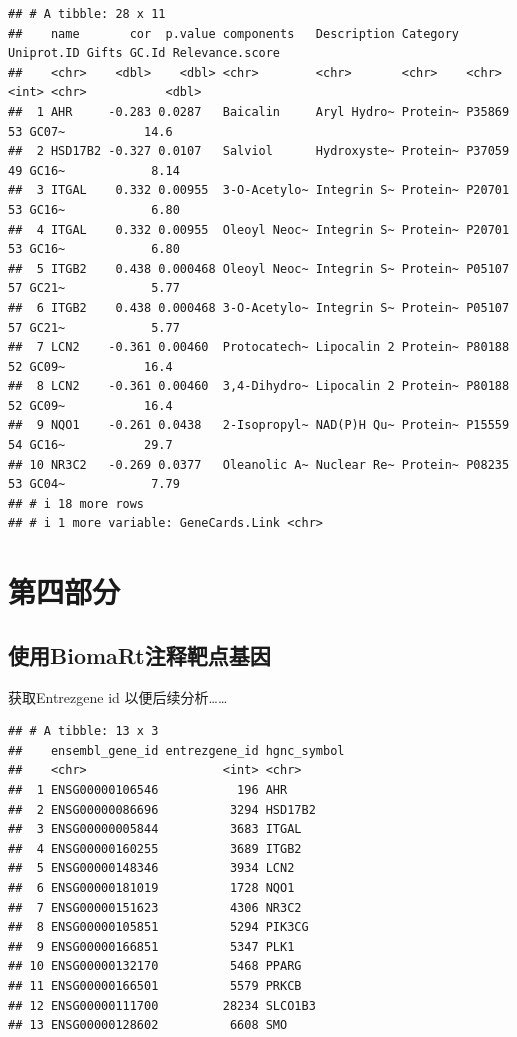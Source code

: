 \documentclass[
]{article}
\begin{document}
\begin{verbatim}
## # A tibble: 28 x 11
##    name       cor  p.value components   Description Category Uniprot.ID Gifts GC.Id Relevance.score
##    <chr>    <dbl>    <dbl> <chr>        <chr>       <chr>    <chr>      <int> <chr>           <dbl>
##  1 AHR     -0.283 0.0287   Baicalin     Aryl Hydro~ Protein~ P35869        53 GC07~           14.6 
##  2 HSD17B2 -0.327 0.0107   Salviol      Hydroxyste~ Protein~ P37059        49 GC16~            8.14
##  3 ITGAL    0.332 0.00955  3-O-Acetylo~ Integrin S~ Protein~ P20701        53 GC16~            6.80
##  4 ITGAL    0.332 0.00955  Oleoyl Neoc~ Integrin S~ Protein~ P20701        53 GC16~            6.80
##  5 ITGB2    0.438 0.000468 Oleoyl Neoc~ Integrin S~ Protein~ P05107        57 GC21~            5.77
##  6 ITGB2    0.438 0.000468 3-O-Acetylo~ Integrin S~ Protein~ P05107        57 GC21~            5.77
##  7 LCN2    -0.361 0.00460  Protocatech~ Lipocalin 2 Protein~ P80188        52 GC09~           16.4 
##  8 LCN2    -0.361 0.00460  3,4-Dihydro~ Lipocalin 2 Protein~ P80188        52 GC09~           16.4 
##  9 NQO1    -0.261 0.0438   2-Isopropyl~ NAD(P)H Qu~ Protein~ P15559        54 GC16~           29.7 
## 10 NR3C2   -0.269 0.0377   Oleanolic A~ Nuclear Re~ Protein~ P08235        53 GC04~            7.79
## # i 18 more rows
## # i 1 more variable: GeneCards.Link <chr>
\end{verbatim}

\hypertarget{ux7b2cux56dbux90e8ux5206}{%
\section{第四部分}\label{ux7b2cux56dbux90e8ux5206}}

\hypertarget{ux4f7fux7528biomartux6ce8ux91caux9776ux70b9ux57faux56e0}{%
\subsection{使用BiomaRt注释靶点基因}\label{ux4f7fux7528biomartux6ce8ux91caux9776ux70b9ux57faux56e0}}

获取Entrezgene id 以便后续分析\ldots\ldots{}

\begin{verbatim}
## # A tibble: 13 x 3
##    ensembl_gene_id entrezgene_id hgnc_symbol
##    <chr>                   <int> <chr>      
##  1 ENSG00000106546           196 AHR        
##  2 ENSG00000086696          3294 HSD17B2    
##  3 ENSG00000005844          3683 ITGAL      
##  4 ENSG00000160255          3689 ITGB2      
##  5 ENSG00000148346          3934 LCN2       
##  6 ENSG00000181019          1728 NQO1       
##  7 ENSG00000151623          4306 NR3C2      
##  8 ENSG00000105851          5294 PIK3CG     
##  9 ENSG00000166851          5347 PLK1       
## 10 ENSG00000132170          5468 PPARG      
## 11 ENSG00000166501          5579 PRKCB      
## 12 ENSG00000111700         28234 SLCO1B3    
## 13 ENSG00000128602          6608 SMO
\end{verbatim}
\end{document}
